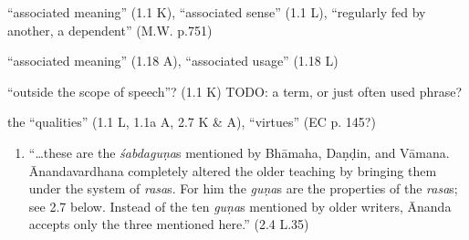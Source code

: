 \documentclass[10pt]{article}
\begin{document}
\begin{multicols}{2}
\begin{enumerate}[
			leftmargin=0em,
			rightmargin=0em,
		]
		 ``associated meaning'' (1.1 K), ``associated sense'' (1.1 L), ``regularly fed by another, a dependent'' (M.W. p.751)
		\begin{itemize}
			 ``associated meaning'' (1.18 A), ``associated usage'' (1.18 L)
		\end{itemize}



		 ``outside the scope of speech''? (1.1 K) TODO: a term, or just often used phrase?



		 the ``qualities'' (1.1 L, 1.1a A, 2.7 K \& A), ``virtues'' (EC p. 145?)
		\begin{enumerate}
			 ``sweetness'' (2.7 K.1)

			 ``force'' (2.7 K.1)

			 ``clarity'' (2.7 K.1), ``perspicuity'' [K. Kris.\ 2.10 K?]

			\item ``\dots these are the \textit{śabdaguṇa}s mentioned by Bhāmaha, Daṇḍin, and Vāmana. Ānanda\-var\-dhana completely altered the older teaching by bringing them under the system of \textit{rasa}s. For him the \textit{guṇa}s are the properties of the \textit{rasa}s; see 2.7 below. Instead of the ten \textit{guṇa}s mentioned by older writers, Ānanda accepts only the three mentioned here.'' (2.4 L.35)
		\end{enumerate}



\end{enumerate}
\end{multicols}
\end{document}

